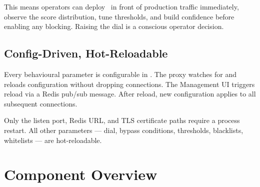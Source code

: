 This means operators can deploy \ja\ in front of production traffic immediately,
observe the score distribution, tune thresholds, and build confidence before enabling
any blocking. Raising the dial is a conscious operator decision.

\subsection{Config-Driven, Hot-Reloadable}

Every behavioural parameter is configurable in . The proxy
watches for  and reloads configuration without dropping connections.
The Management UI triggers reload via a Redis pub/sub message. After reload, new
configuration applies to all subsequent connections.

Only the listen port, Redis URL, and TLS certificate paths require a process restart.
All other parameters — dial, bypass conditions, thresholds, blacklists, whitelists —
are hot-reloadable.

\section{Component Overview}

